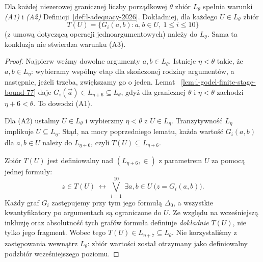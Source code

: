 \begin{lemat}
\label{lem:l-limit-godel-adequacy-77}
Dla każdej niezerowej granicznej liczby porządkowej
$\theta$ zbiór $L_\theta$ spełnia warunki
\emph{(A1)} i \emph{(A2)}
Definicji~\ref{def:l-adequacy-2026}.
Dokładniej, dla każdego $U\in L_\theta$ zbiór
\[
T(U)=\{G_i(a,b):a,b\in U,\ 1\le i\le10\}
\]
(z umową dotyczącą operacji jednoargumentowych)
należy do $L_\theta$.
Sama ta konkluzja nie stwierdza warunku (A3).
\end{lemat}
\begin{proof}
Najpierw weźmy dowolne argumenty $a,b\in L_\theta$.
Istnieje $\eta<\theta$ takie, że $a,b\in L_\eta$:
wybieramy wspólny etap dla skończonej rodziny
argumentów, a następnie, jeżeli trzeba,
zwiększamy go o jeden. Lemat~
\ref{lem:l-godel-finite-stage-bound-77}
daje $G_i(\vec a)\in L_{\eta+6}\subseteq L_\theta$,
gdyż dla granicznej $\theta$ i $\eta<\theta$
zachodzi $\eta+6<\theta$. To dowodzi (A1).

Dla (A2) ustalmy $U\in L_\theta$ i wybierzmy
$\eta<\theta$ z $U\in L_\eta$. Tranzytywność
$L_\eta$ implikuje $U\subseteq L_\eta$.
Stąd, na mocy poprzedniego lematu,
każda wartość $G_i(a,b)$ dla $a,b\in U$
należy do $L_{\eta+6}$, czyli
$T(U)\subseteq L_{\eta+6}$.

Zbiór $T(U)$ jest definiowalny nad
$(L_{\eta+6},\in)$ z parametrem $U$ za pomocą
jednej formuły:
\[
 z\in T(U)\ \longleftrightarrow\
 \bigvee_{i=1}^{10}\ \exists a,b\in U\
                 \bigl(z=G_i(a,b)\bigr).
\]
Każdy graf $G_i$ zastępujemy przy tym jego
formułą $\Delta_0$, a wszystkie kwantyfikatory
po argumentach są ograniczone do $U$.
Ze względu na wcześniejszą inkluzję oraz
absolutność tych grafów formuła definiuje
\emph{dokładnie} $T(U)$, nie tylko jego fragment.
Wobec tego
$T(U)\in L_{\eta+7}\subseteq L_\theta$.
Nie korzystaliśmy z zastępowania wewnątrz
$L_\theta$: zbiór wartości został otrzymany
jako definiowalny podzbiór wcześniejszego poziomu.
\end{proof}

